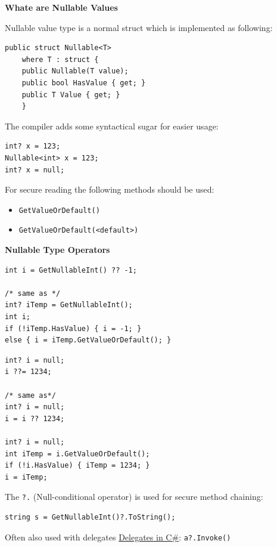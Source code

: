 \documentclass[11pt,twoside,landscape]{article}
\begin{document}
\begin{multicols}{3}
\textbf{Whate are Nullable Values}

Nullable value type is a normal struct which is implemented as following:
\lstset{language=csharp,label= ,caption= ,captionpos=b,numbers=none}
\begin{lstlisting}
public struct Nullable<T>
    where T : struct {
	public Nullable(T value);
	public bool HasValue { get; }
	public T Value { get; }
    }
\end{lstlisting}

The compiler adds some syntactical sugar for easier usage:
\lstset{language=csharp,label= ,caption= ,captionpos=b,numbers=none}
\begin{lstlisting}
int? x = 123;
Nullable<int> x = 123;
int? x = null;
\end{lstlisting}

For secure reading the following methods should be used:
\begin{itemize}
\item \texttt{GetValueOrDefault()}
\item \texttt{GetValueOrDefault(<default>)}
\end{itemize}


\textbf{Nullable Type Operators}
\lstset{language=csharp,label= ,caption= ,captionpos=b,numbers=none}
\begin{lstlisting}
int i = GetNullableInt() ?? -1;

/* same as */
int? iTemp = GetNullableInt();
int i;
if (!iTemp.HasValue) { i = -1; }
else { i = iTemp.GetValueOrDefault(); }
\end{lstlisting}

\lstset{language=csharp,label= ,caption= ,captionpos=b,numbers=none}
\begin{lstlisting}
int? i = null;
i ??= 1234;

/* same as*/
int? i = null;
i = i ?? 1234;

int? i = null;
int iTemp = i.GetValueOrDefault();
if (!i.HasValue) { iTemp = 1234; }
i = iTemp;

\end{lstlisting}


The \texttt{?.} (Null-conditional operator) is used for secure method chaining:
\lstset{language=csharp,label= ,caption= ,captionpos=b,numbers=none}
\begin{lstlisting}
string s = GetNullableInt()?.ToString();
\end{lstlisting}
Often also used with delegates \href{../../../roam/20211029145415-delegates_in_c.org}{Delegates in C\#}: \texttt{a?.Invoke()}


\end{multicols}
\end{document}
